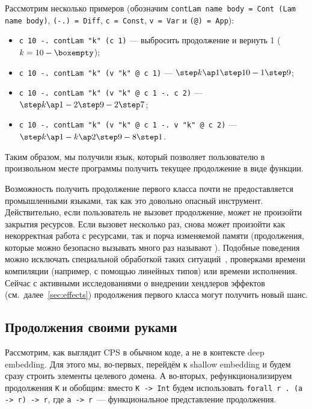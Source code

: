 Рассмотрим несколько примеров (обозначим \texttt{contLam name body = Cont (Lam name body)}, \texttt{(-.) = Diff}, \texttt{c = Const}, \texttt{v = Var} и \texttt{(@) = App}):
\begin{itemize}
    \item \texttt{c 10 -. contLam "k" (c 1)} --- выбросить продолжение и вернуть 1 ($k = 10 - \boxempty$);
    \item \texttt{c 10 -. contLam "k" (v "k" @ c 1)} --- $\step k\ap 1 \step 10 - 1 \step 9$;
    \item \texttt{c 10 -. contLam "k" (v "k" @ c 1 -. c 2)} --- $\step k \ap 1 - 2 \step 9 - 2 \step 7$;
    \item \texttt{c 10 -. contLam "k" (v "k" @ c 1 -. v "k" @ c 2)} --- $\step k \ap 1 - k \ap 2 \step 9 - 8 \step 1$.
\end{itemize}

Таким образом, мы получили язык, который позволяет пользователю в произвольном месте программы получить текущее продолжение в виде функции.

Возможность получить продолжение первого класса почти не предоставляется промышленными языками, так как это довольно опасный инструмент.
Действительно, если пользователь не вызовет продолжение, может не произойти закрытия ресурсов.
Если вызовет несколько раз, снова может произойти как некорректная работа с ресурсами, так и порча изменяемой памяти (продолжения, которые можно безопасно вызывать много раз называют ).
Подобные поведения можно исключать специальной обработкой таких ситуаций~\cite{muhcu2025multiple}, проверками времени компиляции (например, с помощью линейных типов) или времени исполнения.
Сейчас с активными исследованиями о внедрении хендлеров эффектов (см.\ далее\ \ref{sec:effects}) продолжения первого класса могут получить новый шанс.

\subsection{Продолжения своими руками} \label{subsec:functional-cps}


Рассмотрим, как выглядит CPS в обычном коде, а не в контексте deep embedding.
Для этого мы, во-первых, перейдём к shallow embedding и будем сразу строить элементы целевого домена.
А во-вторых, рефункционализируем продолжения \texttt{K} и обобщим: вместо \texttt{K -> Int} будем использовать \texttt{forall r . (a -> r) -> r}, где \texttt{a -> r}~--- функциональное представление продолжения.

